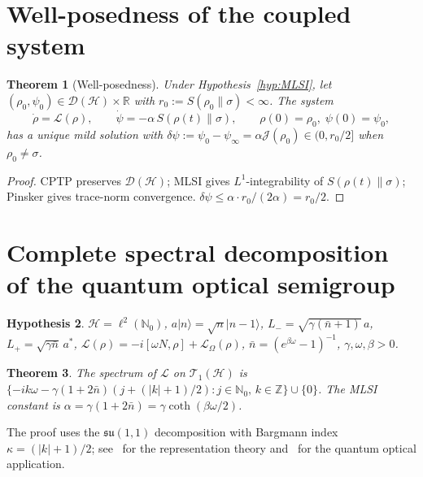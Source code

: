 \documentclass[11pt,a4paper]{article}
\newtheorem{theorem}{Theorem}[section]
\newtheorem{hypothesis}[theorem]{Hypothesis}
\theoremstyle{definition}
\theoremstyle{remark}
\newcommand{\R}{\mathbb{R}}
\newcommand{\N}{\mathbb{N}}
\newcommand{\Z}{\mathbb{Z}}
\newcommand{\HH}{\mathcal{H}}
\newcommand{\DD}{\mathcal{D}}
\newcommand{\TT}{\mathcal{T}}
\newcommand{\LL}{\mathcal{L}}
\newcommand{\ket}[1]{\lvert #1 \rangle}
\newcommand{\LOm}{\mathcal{L}_{\Omega}}
\begin{document}
\section{Well-posedness of the coupled system}\label{sec:coupled}

\begin{theorem}[Well-posedness]\label{thm:wp}
Under Hypothesis~\ref{hyp:MLSI}, let
$(\rho_0, \psi_0) \in \DD(\HH) \times \R$ with
$r_0 := S(\rho_0\|\sigma) < \infty$.  The system
\begin{equation}\label{eq:system}
  \dot\rho = \LL(\rho), \qquad
  \dot\psi = -\alpha\, S(\rho(t)\|\sigma), \qquad
  \rho(0) = \rho_0,\; \psi(0) = \psi_0,
\end{equation}
has a unique mild solution with
$\delta\psi := \psi_0 - \psi_\infty
= \alpha\mathcal{J}(\rho_0) \in (0, r_0/2]$
when $\rho_0 \ne \sigma$.
\end{theorem}

\begin{proof}
CPTP preserves $\DD(\HH)$; MLSI gives $L^1$-integrability of
$S(\rho(t)\|\sigma)$; Pinsker gives trace-norm convergence.
$\delta\psi \le \alpha\cdot r_0/(2\alpha) = r_0/2$.
\end{proof}

\section{Complete spectral decomposition of the quantum optical
semigroup}\label{sec:gap}

\begin{hypothesis}\label{hyp:QOS}
$\HH = \ell^2(\N_0)$, $a\ket{n} = \sqrt{n}\ket{n-1}$,
$L_- = \sqrt{\gamma(\bar{n}+1)}\,a$,
$L_+ = \sqrt{\gamma\bar{n}}\,a^*$,
$\LL(\rho) = -i[\omega N, \rho] + \LOm(\rho)$,
$\bar{n} = (e^{\beta\omega}-1)^{-1}$, $\gamma, \omega, \beta > 0$.
\end{hypothesis}

\begin{theorem}\label{thm:gap}
The spectrum of $\LL$ on $\TT_1(\HH)$ is
$\{-ik\omega - \gamma(1+2\bar{n})(j + (|k|+1)/2) :
j \in \N_0,\, k \in \Z\} \cup \{0\}$.
The MLSI constant is $\alpha = \gamma(1+2\bar{n})
= \gamma\coth(\beta\omega/2)$.
\end{theorem}

The proof uses the $\mathfrak{su}(1,1)$ decomposition with Bargmann
index $\kappa = (|k|+1)/2$; see~\cite{Perelomov1986} for the
representation theory and~\cite{Spohn1977,BarnettStenholm2001} for
the quantum optical application.
\end{document}
